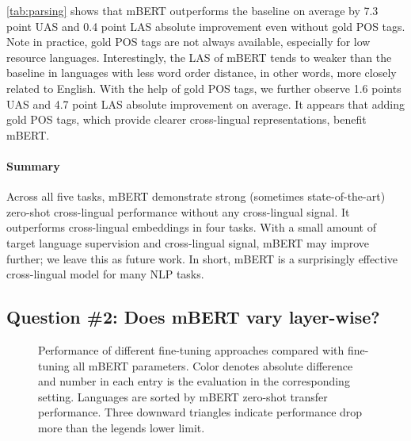 \documentclass[11pt,a4paper]{article}
\begin{document}
\cref{tab:parsing} shows that mBERT outperforms the baseline on average by 7.3 point UAS and 0.4 point LAS absolute improvement even without gold POS tags. Note in practice, gold POS tags are not always available, especially for low resource languages.
Interestingly, the LAS of mBERT tends to weaker than the baseline in languages with less word order distance, in other words, more closely related to English.
With the help of gold POS tags, we further observe 1.6 points UAS and 4.7 point LAS absolute improvement on average. It appears that adding gold POS tags, which provide clearer cross-lingual representations, benefit mBERT.

\paragraph{Summary} Across all five tasks, mBERT demonstrate strong (sometimes state-of-the-art) zero-shot cross-lingual performance without any cross-lingual signal. It outperforms cross-lingual embeddings in four tasks. With a small amount of target language supervision and cross-lingual signal, mBERT may improve further; we leave this as future work. In short, mBERT is a surprisingly effective cross-lingual model for many NLP tasks.


\subsection{Question \#2: Does mBERT vary layer-wise?}\label{sec:exp2}


\begin{figure*}[ht]
\centering
{}
\qquad

\qquad


\caption{Performance of different fine-tuning approaches compared with fine-tuning all mBERT parameters. Color denotes absolute difference and number in each entry is the evaluation in the corresponding setting. Languages are sorted by mBERT zero-shot transfer performance. Three downward triangles indicate performance drop more than the legends lower limit.
}\label{fig:heatmap}
\end{figure*}
\end{document}
